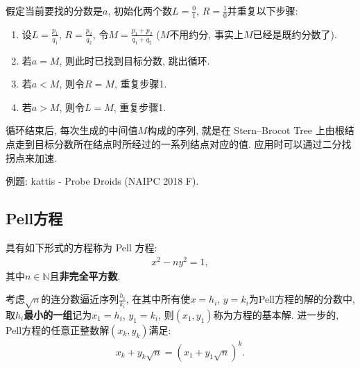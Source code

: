 假定当前要找的分数是$a$, 初始化两个数$L = \frac{0}{1}$, $R = \frac{1}{0}$并重复以下步骤:
\begin{enumerate}
\item
设$L=\frac{p_1}{q_1}$, $R=\frac{p_2}{q_2}$, 令$M=\frac{p_1+p_2}{q_1+q_2}$ ($M$不用约分, 事实上$M$已经是既约分数了).

\item
若$a=M$, 则此时已找到目标分数, 跳出循环.

\item
若$a<M$, 则令$R=M$, 重复步骤1.

\item
若$a>M$, 则令$L=M$, 重复步骤1.
\end{enumerate}
循环结束后, 每次生成的中间值$M$构成的序列, 就是在 Stern–Brocot Tree 上由根结点走到目标分数所在结点时所经过的一系列结点对应的值.
应用时可以通过二分找拐点来加速.

例题: kattis - Probe Droids (NAIPC 2018 F).


\subsection{Pell方程}
具有如下形式的方程称为 Pell 方程:
\begin{gather*}
    x^2 - n y^2 = 1,
\end{gather*}
其中$n \in \mathbb{N}$且\textbf{非完全平方数}.

考虑$\sqrt{n}$的连分数逼近序列$\frac{h_i}{k_i}$, 在其中所有使$x=h_i$, $y=k_i$为Pell方程的解的分数中, 取\textbf{$h_i$最小的一组}记为$x_1=h_i$, $y_1=k_i$, 则$(x_1,y_1)$称为方程的基本解.
进一步的, Pell方程的任意正整数解$(x_k,y_k)$满足:
\begin{gather*}
    x_k + y_k \sqrt{n} = (x_1+y_1 \sqrt{n})^k.
\end{gather*}
